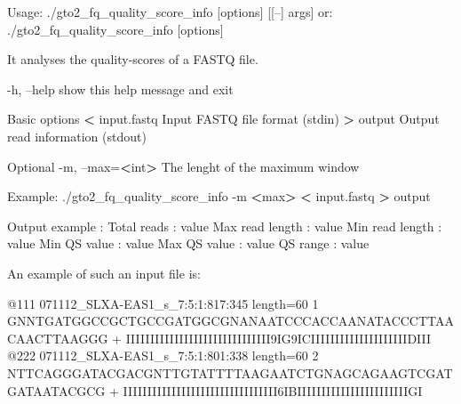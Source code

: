 \documentclass[11pt,]{krantz}
\newenvironment{Shaded}{\begin{snugshade}}{\end{snugshade}}
\newcommand{\OperatorTok}[1]{\textcolor[rgb]{0.43,0.43,0.43}{\textbf{#1}}}
\newcommand{\ExtensionTok}[1]{#1}
\newcommand{\NormalTok}[1]{#1}
\begin{document}
\begin{Shaded}
\begin{Highlighting}[]
\ExtensionTok{Usage}\NormalTok{: ./gto2_fq_quality_score_info [options] [[--] args]}
   \ExtensionTok{or}\NormalTok{: ./gto2_fq_quality_score_info [options]}

\ExtensionTok{It}\NormalTok{ analyses the quality-scores of a FASTQ file.}

    \ExtensionTok{-h}\NormalTok{, --help            show this help message and exit}

\ExtensionTok{Basic}\NormalTok{ options}
    \OperatorTok{<} \ExtensionTok{input.fastq}\NormalTok{         Input FASTQ file format (stdin)}
    \OperatorTok{>} \ExtensionTok{output}\NormalTok{              Output read information (stdout)}
    
\ExtensionTok{Optional}
    \ExtensionTok{-m}\NormalTok{, --max=}\OperatorTok{<}\NormalTok{int}\OperatorTok{>}\NormalTok{       The lenght of the maximum window}

\ExtensionTok{Example}\NormalTok{: ./gto2_fq_quality_score_info -m }\OperatorTok{<}\NormalTok{max}\OperatorTok{>} \OperatorTok{<}\NormalTok{ input.fastq}
\OperatorTok{>} \ExtensionTok{output}

\ExtensionTok{Output}\NormalTok{ example :}
\ExtensionTok{Total}\NormalTok{ reads     : value}
\ExtensionTok{Max}\NormalTok{ read length : value}
\ExtensionTok{Min}\NormalTok{ read length : value}
\ExtensionTok{Min}\NormalTok{ QS value    : value}
\ExtensionTok{Max}\NormalTok{ QS value    : value}
\ExtensionTok{QS}\NormalTok{ range        : value}
\end{Highlighting}
\end{Shaded}

An example of such an input file is:

\begin{Shaded}
\begin{Highlighting}[]
\ExtensionTok{@111}\NormalTok{ 071112_SLXA-EAS1_s_7:5:1:817:345 length=60 1}
\ExtensionTok{GNNTGATGGCCGCTGCCGATGGCGNANAATCCCACCAANATACCCTTAACAACTTAAGGG}
\ExtensionTok{+}
\ExtensionTok{IIIIIIIIIIIIIIIIIIIIIIIIIIIIII9IG9ICIIIIIIIIIIIIIIIIIIIIDIII}
\ExtensionTok{@222}\NormalTok{ 071112_SLXA-EAS1_s_7:5:1:801:338 length=60 2}
\ExtensionTok{NTTCAGGGATACGACGNTTGTATTTTAAGAATCTGNAGCAGAAGTCGATGATAATACGCG}
\ExtensionTok{+}
\ExtensionTok{IIIIIIIIIIIIIIIIIIIIIIIIIIIIIIII6IBIIIIIIIIIIIIIIIIIIIIIIIGI}
\end{Highlighting}
\end{Shaded}
\end{document}
